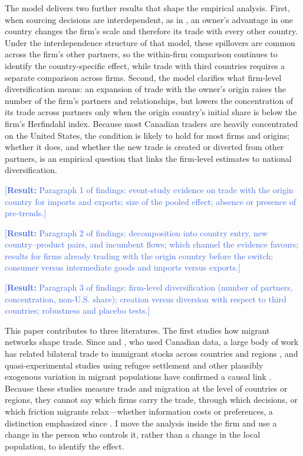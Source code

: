\documentclass[12pt]{article}
\theoremstyle{remark}
\newcommand{\result}[1]{\textcolor{RoyalBlue}{[\textbf{Result:} #1]}}
\begin{document}
The model delivers two further results that shape the empirical analysis.
First, when sourcing decisions are interdependent, as in
\citet{antras2017}, an owner's advantage in one country changes the firm's
scale and therefore its trade with every other country. Under the
interdependence structure of that model, these spillovers are common across
the firm's other partners, so the within-firm comparison continues to
identify the country-specific effect, while trade with third countries
requires a separate comparison across firms. Second, the model clarifies what
firm-level diversification means: an expansion of trade with the owner's
origin raises the number of the firm's partners and relationships, but lowers
the concentration of its trade across partners only when the origin country's
initial share is below the firm's Herfindahl index. Because most Canadian
traders are heavily concentrated on the United States, the condition is
likely to hold for most firms and origins; whether it does, and whether the
new trade is created or diverted from other partners, is an empirical
question that links the firm-level estimates to national diversification.

\result{Paragraph 1 of findings: event-study evidence on trade with the
origin country for imports and exports; size of the pooled effect; absence
or presence of pre-trends.}

\result{Paragraph 2 of findings: decomposition into country entry, new
country--product pairs, and incumbent flows; which channel the evidence
favours; results for firms already trading with the origin country before the
switch; consumer versus intermediate goods and imports versus exports.}

\result{Paragraph 3 of findings: firm-level diversification (number of
partners, concentration, non-U.S. share); creation versus diversion with
respect to third countries; robustness and placebo tests.}

This paper contributes to three literatures. The first studies how migrant
networks shape trade. Since \citet{gould1994} and \citet{headries1998}, who
used Canadian data, a large body of work has related bilateral trade to
immigrant stocks across countries and regions
\citep{wagner2002,rauchtrindade2002,combes2005,peri2010}, and quasi-experimental
studies using refugee settlement and other plausibly exogenous variation in
migrant populations have confirmed a causal link
\citep{cohen2017,parsonsvezina2018,steingress2018,bonadio2026}. Because these
studies measure trade and migration at the level of countries or regions, they
cannot say which firms carry the trade, through which decisions, or which
friction migrants relax---whether information costs or preferences, a
distinction emphasized since \citet{rauch2001}. I move the analysis inside the
firm and use a change in the person who controls it, rather than a change in
the local population, to identify the effect.
\end{document}
